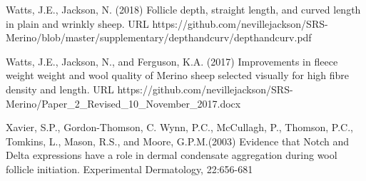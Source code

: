 \documentclass[titlepage]{article}  %
\begin{document}
\begin{thebibliography}{99}
Watts, J.E., Jackson, N. (2018) Follicle depth, straight length, and curved length in plain and wrinkly sheep. URL https://github.com/nevillejackson/SRS-Merino/blob/master/supplementary/depthandcurv/depthandcurv.pdf

Watts, J.E., Jackson, N., and Ferguson, K.A. (2017) Improvements in fleece weight weight and wool quality of Merino sheep selected visually for high fibre density and length. URL https://github.com/nevillejackson/SRS-Merino/Paper\_2\_Revised\_10\_November\_2017.docx 

Xavier, S.P., Gordon-Thomson, C. Wynn, P.C., McCullagh, P., Thomson, P.C., Tomkins, L., Mason, R.S., and Moore, G.P.M.(2003) Evidence that Notch and Delta expressions have a role in dermal condensate aggregation during wool follicle initiation. Experimental Dermatology, 22:656-681

\end{thebibliography}
\end{document}
